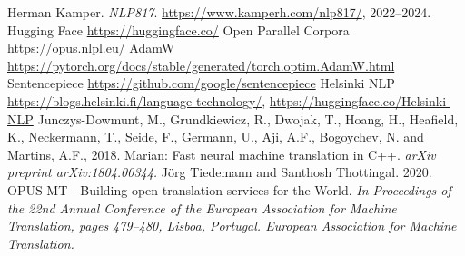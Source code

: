 \begin{thebibliography}{1}

 Herman Kamper. \emph{NLP817}. \href{https://www.kamperh.com/nlp817/}{https://www.kamperh.com/nlp817/}, 2022--2024.
 Hugging Face \href{https://huggingface.co/}{https://huggingface.co/}
 Open Parallel Corpora \href{https://opus.nlpl.eu/}{https://opus.nlpl.eu/}
 AdamW \href{https://pytorch.org/docs/stable/generated/torch.optim.AdamW.html}{https://pytorch.org/docs/stable/generated/torch.optim.AdamW.html}
 Sentencepiece \href{https://github.com/google/sentencepiece}{https://github.com/google/sentencepiece}
 Helsinki NLP \href{https://blogs.helsinki.fi/language-technology/}{https://blogs.helsinki.fi/language-technology/}, \href{https://huggingface.co/Helsinki-NLP}{https://huggingface.co/Helsinki-NLP}
 Junczys-Dowmunt, M., Grundkiewicz, R., Dwojak, T., Hoang, H., Heafield, K., Neckermann, T., Seide, F., Germann, U., Aji, A.F., Bogoychev, N. and Martins, A.F., 2018. Marian: Fast neural machine translation in C++. \textit{arXiv preprint arXiv:1804.00344.}
 Jörg Tiedemann and Santhosh Thottingal. 2020. OPUS-MT - Building open translation services for the World. \textit{In Proceedings of the 22nd Annual Conference of the European Association for Machine Translation, pages 479–480, Lisboa, Portugal. European Association for Machine Translation.}
\end{thebibliography}